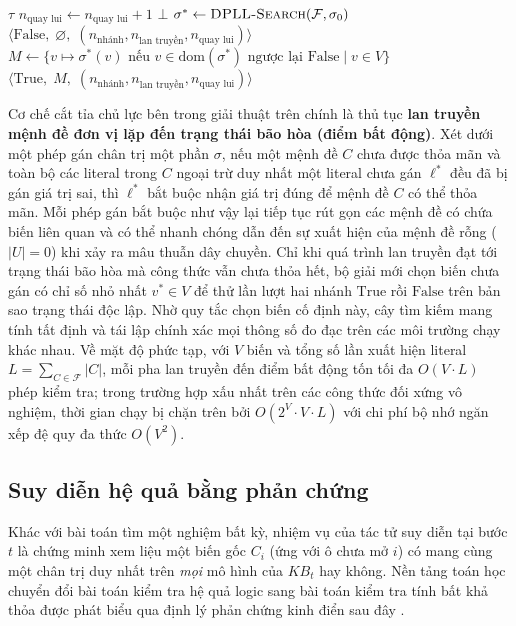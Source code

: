 \begin{algorithm}[H]
\begin{algorithmic}[1]
        \If{$\tau \ne \bot$} \Return $\tau$ \EndIf
        \State $n_{\text{quay lui}} \gets n_{\text{quay lui}} + 1$
    \EndFor
    \State \Return $\bot$
\EndFunction
\State $\sigma^* \gets \Call{DPLL-Search}{\mathcal{F}, \sigma_0}$
\If{$\sigma^* = \bot$} \Return $\langle \text{False},\; \varnothing,\;
    (n_{\text{nhánh}}, n_{\text{lan truyền}}, n_{\text{quay lui}}) \rangle$ \EndIf
\State $M \gets \{v \mapsto \sigma^*(v) \text{ nếu } v \in \mathrm{dom}(\sigma^*)
    \text{ ngược lại } \text{False} \mid v \in V\}$
\State \Return $\langle \text{True},\; M,\;
    (n_{\text{nhánh}}, n_{\text{lan truyền}}, n_{\text{quay lui}}) \rangle$
\end{algorithmic}
\end{algorithm}

Cơ chế cắt tỉa chủ lực bên trong giải thuật trên chính là thủ tục \textbf{lan
truyền mệnh đề đơn vị lặp đến trạng thái bão hòa (điểm bất động)}. Xét dưới một
phép gán chân trị một phần $\sigma$, nếu một mệnh đề $C$ chưa được thỏa mãn và
toàn bộ các literal trong $C$ ngoại trừ duy nhất một literal chưa gán $\ell^*$ đều
đã bị gán giá trị sai, thì $\ell^*$ bắt buộc nhận giá trị đúng để mệnh đề $C$ có
thể thỏa mãn. Mỗi phép gán bắt buộc như vậy lại tiếp tục rút gọn các mệnh đề có
chứa biến liên quan và có thể nhanh chóng dẫn đến sự xuất hiện của mệnh đề rỗng
($|U| = 0$) khi xảy ra mâu thuẫn dây chuyền. Chỉ khi quá trình lan truyền đạt tới
trạng thái bão hòa mà công thức vẫn chưa thỏa hết, bộ giải mới chọn biến chưa gán
có chỉ số nhỏ nhất $v^* \in V$ để thử lần lượt hai nhánh $\text{True}$ rồi
$\text{False}$ trên bản sao trạng thái độc lập. Nhờ quy tắc chọn biến cố định này,
cây tìm kiếm mang tính tất định và tái lập chính xác mọi thông số đo đạc trên các
môi trường chạy khác nhau. Về mặt độ phức tạp, với $V$ biến và tổng số lần xuất
hiện literal $L = \sum_{C \in \mathcal{F}} |C|$, mỗi pha lan truyền đến điểm bất
động tốn tối đa $O(V \cdot L)$ phép kiểm tra; trong trường hợp xấu nhất trên các
công thức đối xứng vô nghiệm, thời gian chạy bị chặn trên bởi $O(2^V \cdot V \cdot
L)$ với chi phí bộ nhớ ngăn xếp đệ quy đa thức $O(V^2)$.

\subsection{Suy diễn hệ quả bằng phản chứng}
\label{subsec:logic_agent}
Khác với bài toán tìm một nghiệm bất kỳ, nhiệm vụ của tác tử suy diễn tại bước $t$
là chứng minh xem liệu một biến gốc $C_i$ (ứng với ô chưa mở $i$) có mang cùng một
chân trị duy nhất trên \textit{mọi} mô hình của $KB_t$ hay không. Nền tảng toán
học chuyển đổi bài toán kiểm tra hệ quả logic sang bài toán kiểm tra tính bất khả
thỏa được phát biểu qua định lý phản chứng kinh điển sau đây
\cite{russell2020aima}.

